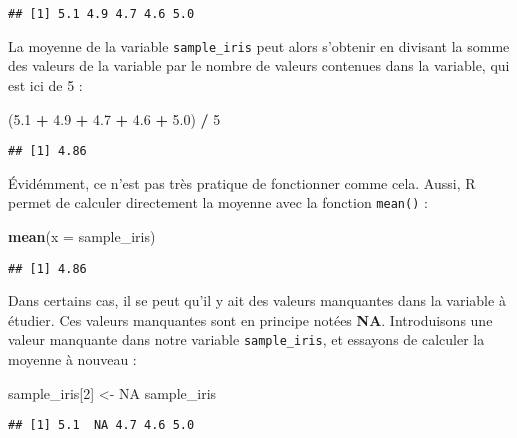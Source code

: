 \documentclass[
  french,
]{book}
\newenvironment{Shaded}{\begin{snugshade}}{\end{snugshade}}
\newcommand{\DataTypeTok}[1]{\textcolor[rgb]{0.13,0.29,0.53}{#1}}
\newcommand{\DecValTok}[1]{\textcolor[rgb]{0.00,0.00,0.81}{#1}}
\newcommand{\FloatTok}[1]{\textcolor[rgb]{0.00,0.00,0.81}{#1}}
\newcommand{\KeywordTok}[1]{\textcolor[rgb]{0.13,0.29,0.53}{\textbf{#1}}}
\newcommand{\NormalTok}[1]{#1}
\newcommand{\OperatorTok}[1]{\textcolor[rgb]{0.81,0.36,0.00}{\textbf{#1}}}
\newcommand{\OtherTok}[1]{\textcolor[rgb]{0.56,0.35,0.01}{#1}}
\newcommand{\StringTok}[1]{\textcolor[rgb]{0.31,0.60,0.02}{#1}}
\begin{document}
\begin{verbatim}
## [1] 5.1 4.9 4.7 4.6 5.0
\end{verbatim}

La moyenne de la variable \texttt{sample\_iris} peut alors s'obtenir en divisant la somme des valeurs de la variable par le nombre de valeurs contenues dans la variable, qui est ici de 5 :

\begin{Shaded}
\begin{Highlighting}[]
\NormalTok{(}\FloatTok{5.1} \OperatorTok{+}\StringTok{ }\FloatTok{4.9} \OperatorTok{+}\StringTok{ }\FloatTok{4.7} \OperatorTok{+}\StringTok{ }\FloatTok{4.6} \OperatorTok{+}\StringTok{ }\FloatTok{5.0}\NormalTok{) }\OperatorTok{/}\StringTok{ }\DecValTok{5}
\end{Highlighting}
\end{Shaded}

\begin{verbatim}
## [1] 4.86
\end{verbatim}

Évidémment, ce n'est pas très pratique de fonctionner comme cela. Aussi, R permet de calculer directement la moyenne avec la fonction \texttt{mean()} :

\begin{Shaded}
\begin{Highlighting}[]
\KeywordTok{mean}\NormalTok{(}\DataTypeTok{x =}\NormalTok{ sample_iris)}
\end{Highlighting}
\end{Shaded}

\begin{verbatim}
## [1] 4.86
\end{verbatim}

Dans certains cas, il se peut qu'il y ait des valeurs manquantes dans la variable à étudier. Ces valeurs manquantes sont en principe notées \textbf{NA}. Introduisons une valeur manquante dans notre variable \texttt{sample\_iris}, et essayons de calculer la moyenne à nouveau :

\begin{Shaded}
\begin{Highlighting}[]
\NormalTok{sample_iris[}\DecValTok{2}\NormalTok{] <-}\StringTok{ }\OtherTok{NA}
\NormalTok{sample_iris}
\end{Highlighting}
\end{Shaded}

\begin{verbatim}
## [1] 5.1  NA 4.7 4.6 5.0
\end{verbatim}
\end{document}
